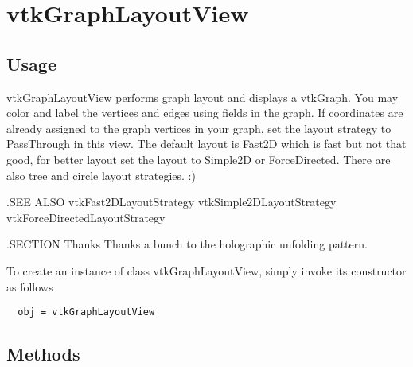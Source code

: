 \section{vtkGraphLayoutView}

\subsection{Usage}

 vtkGraphLayoutView performs graph layout and displays a vtkGraph.
 You may color and label the vertices and edges using fields in the graph.
 If coordinates are already assigned to the graph vertices in your graph,
 set the layout strategy to PassThrough in this view. The default layout
 is Fast2D which is fast but not that good, for better layout set the
 layout to Simple2D or ForceDirected. There are also tree and circle
 layout strategies. :)
 
 .SEE ALSO
 vtkFast2DLayoutStrategy
 vtkSimple2DLayoutStrategy
 vtkForceDirectedLayoutStrategy

 .SECTION Thanks
 Thanks a bunch to the holographic unfolding pattern.

To create an instance of class vtkGraphLayoutView, simply
invoke its constructor as follows
\begin{verbatim}
  obj = vtkGraphLayoutView
\end{verbatim}
\subsection{Methods}

